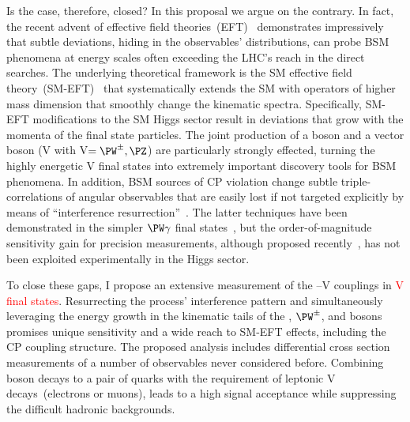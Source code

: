 \documentclass[a4paper,11pt]{article}
\newcommand{\Pb}{{{\Pqb}}\xspace}
\renewcommand{\PV}{{{{V}}}\xspace}
\newcommand{\VH}{{{\PV}{\PH}}\xspace}
\begin{document}
Is the case, therefore, closed? 
In this proposal we argue on the contrary. In fact, the recent advent of effective field theories~(EFT)~\cite{Grinstein:1991cd,Chiu:2007dg,Passarino:2016pzb} demonstrates impressively that subtle deviations, hiding in the observables' distributions, can probe BSM phenomena at energy scales often exceeding the LHC's reach in the direct searches. 
The underlying theoretical framework is the SM effective field theory~(SM-EFT)~\cite{Jenkins:2013zja,Alonso:2013hga,Jenkins:2013wua,Englert:2014cva,Brivio:2017vri} that systematically extends the SM with operators of higher mass dimension that smoothly change the kinematic spectra.
Specifically,  SM-EFT modifications to the SM Higgs sector result in deviations that grow with the momenta of the final state particles. 
The joint production of a \PH boson and a vector boson (\VH with \PV$=\PW^{\pm},\PZ$) are particularly strongly effected, turning the highly energetic \VH final states into extremely important discovery tools for BSM phenomena. 
In addition, BSM sources of CP violation change subtle triple-correlations of angular observables that are easily lost if not targeted explicitly by means of ``interference resurrection''~\cite{Panico:2017frx}.
The latter techniques have been demonstrated in the simpler $\PW\gamma$ final states~\cite{CMS-PAS-SMP-20-005}, but the order-of-magnitude sensitivity gain for precision measurements, although proposed recently~\cite{Banerjee:2019twi}, has not been exploited experimentally in the Higgs sector. 

To close these gaps, I propose an extensive measurement of the \PH--\PV couplings in \textcolor{red}{\VH final states}. Resurrecting the process' interference pattern and simultaneously leveraging the energy growth in the kinematic tails of the \PH, $\PW^{\pm}$, and \PZ bosons promises unique sensitivity and a wide reach to SM-EFT effects, including the CP coupling structure.
The proposed analysis includes differential cross section measurements of a number of observables never considered before.
Combining \PH boson decays to a pair of \Pb quarks with the requirement of leptonic \PV decays~(electrons or muons), leads to a high signal acceptance while suppressing the difficult hadronic backgrounds.  
\end{document}

